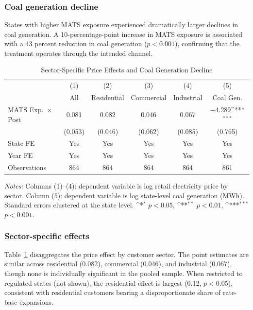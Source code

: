 \documentclass[12pt]{article}
\newcommand{\sym}[1]{\ifmmode^{#1}\else\(^{#1}\)\fi}
\begin{document}
\subsubsection*{Coal generation decline} States with higher MATS exposure experienced dramatically larger declines in coal generation. A 10-percentage-point increase in MATS exposure is associated with a 43 percent reduction in coal generation ($p < 0.001$), confirming that the treatment operates through the intended channel.

\begin{table}[H]
\centering
\caption{Sector-Specific Price Effects and Coal Generation Decline}
\begin{threeparttable}
\begin{tabular}{lccccc}
\toprule
& (1) & (2) & (3) & (4) & (5) \\
& All & Residential & Commercial & Industrial & Coal Gen. \\
\midrule
MATS Exp.\ $\times$ Post & 0.081 & 0.082 & 0.046 & 0.067 & $-$4.289\sym{***} \\
& (0.053) & (0.046) & (0.062) & (0.085) & (0.765) \\
\addlinespace
State FE & Yes & Yes & Yes & Yes & Yes \\
Year FE & Yes & Yes & Yes & Yes & Yes \\
Observations & 864 & 864 & 864 & 864 & 861 \\
\bottomrule
\end{tabular}
\begin{tablenotes}[flushleft]
\small
\item \textit{Notes:} Columns (1)--(4): dependent variable is log retail electricity price by sector. Column (5): dependent variable is log state-level coal generation (MWh). Standard errors clustered at the state level. \sym{*} $p<0.05$, \sym{**} $p<0.01$, \sym{***} $p<0.001$.
\end{tablenotes}
\end{threeparttable}
\label{tab:sectors}
\end{table}

\subsubsection*{Sector-specific effects} Table~\ref{tab:sectors} disaggregates the price effect by customer sector. The point estimates are similar across residential (0.082), commercial (0.046), and industrial (0.067), though none is individually significant in the pooled sample. When restricted to regulated states (not shown), the residential effect is largest (0.12, $p < 0.05$), consistent with residential customers bearing a disproportionate share of rate-base expansions.
\end{document}
